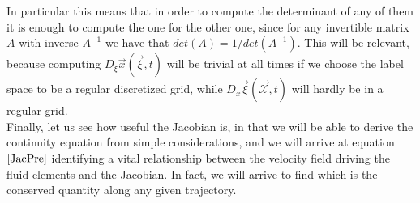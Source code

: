 \documentclass[11pt, a4paper]{article} %
\newcommand{\x}{\mathcal{X}}
\DeclareRobustCommand{\mybox}[2][gray!20]{%
\begin{tcolorbox}[   %
        left=1cm,
        right=1cm,
        top=0.5cm,
        bottom=0.5cm,
        colback=#1,
        colframe=#1,
        width=\dimexpr\textwidth\relax, 
        enlarge left by=0mm,
        boxsep=5pt,
        arc=0pt,outer arc=0pt,
        ]
        #2
\end{tcolorbox}
}
\begin{document}
\mybox{
In particular this means that in order to compute the determinant of any of them it is enough to compute the one for the other one, since for any invertible matrix $A$ with inverse $A^{-1}$ we have that $det(A)=1/det(A^{-1})$. This will be relevant, because computing $D_\xi \vec{x}(\vec{\xi},t)$ will be trivial at all times if we choose the label space to be a regular discretized grid, while $D_x \vec{\xi}(\vec{\x},t)$ will hardly be in a regular grid.\\

Finally, let us see how useful the Jacobian is, in that we will be able to derive the continuity equation from simple considerations, and we will arrive at equation $\eqref{JacPre}$ identifying a vital relationship between the velocity field driving the fluid elements and the Jacobian. In fact, we will arrive to find which is the conserved quantity along any given trajectory.\\

}
\end{document}
